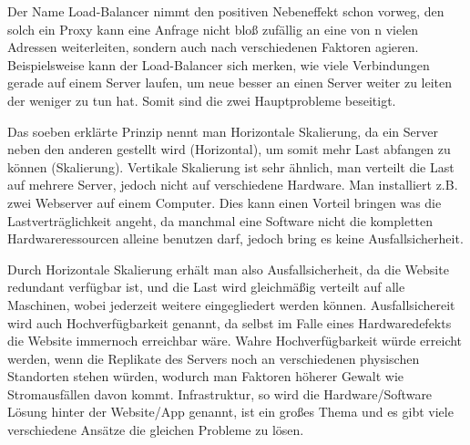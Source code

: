 Der Name Load-Balancer nimmt den positiven Nebeneffekt schon vorweg, den solch ein Proxy kann eine Anfrage nicht bloß zufällig an eine von n vielen Adressen weiterleiten, sondern auch nach verschiedenen Faktoren agieren.
Beispielsweise kann der Load-Balancer sich merken, wie viele Verbindungen gerade auf einem Server laufen, um neue besser an einen Server weiter zu leiten der weniger zu tun hat. Somit sind die zwei Hauptprobleme beseitigt.

Das soeben erklärte Prinzip nennt man Horizontale Skalierung, da ein Server neben den anderen gestellt wird (Horizontal), um somit mehr Last abfangen zu können (Skalierung).
Vertikale Skalierung ist sehr ähnlich, man verteilt die Last auf mehrere Server, jedoch nicht auf verschiedene Hardware. Man installiert z.B. zwei Webserver auf einem Computer. 
Dies kann einen Vorteil bringen was die Lastverträglichkeit angeht, da manchmal eine Software nicht die kompletten Hardwareressourcen alleine benutzen darf, jedoch bring es keine Ausfallsicherheit.

Durch Horizontale Skalierung erhält man also Ausfallsicherheit, da die Website redundant verfügbar ist, und die Last wird gleichmäßig verteilt auf alle Maschinen, wobei jederzeit weitere eingegliedert werden können.
Ausfallsichereit wird auch Hochverfügbarkeit genannt, da selbst im Falle eines Hardwaredefekts die Website immernoch erreichbar wäre. Wahre Hochverfügbarkeit würde erreicht werden, wenn die Replikate des Servers noch
an verschiedenen physischen Standorten stehen würden, wodurch man Faktoren höherer Gewalt wie Stromausfällen davon kommt. Infrastruktur, so wird die Hardware/Software Lösung hinter der Website/App genannt, ist ein großes
Thema und es gibt viele verschiedene Ansätze die gleichen Probleme zu lösen.


